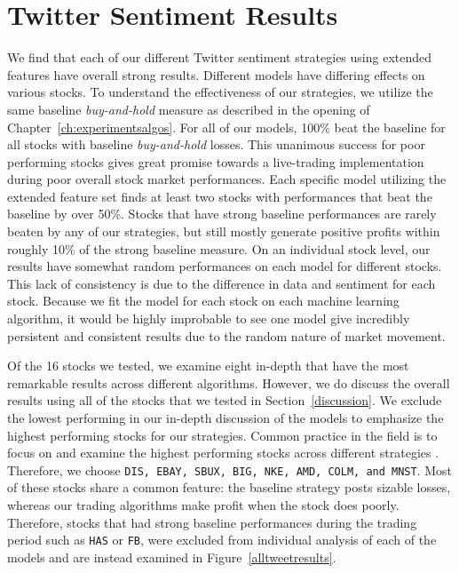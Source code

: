 \documentclass[../thesis.tex]{subfiles}
\begin{document}
\chapter{Twitter Sentiment Results}
\label{ch:sentimentresults}

We find that each of our different Twitter sentiment strategies using extended features have overall strong results. Different models have differing effects on various stocks. To understand the effectiveness of our strategies, we utilize the same baseline \textit{buy-and-hold} measure as described in the opening of Chapter~\ref{ch:experimentsalgos}. For all of our models, 100\% beat the baseline for all stocks with baseline \textit{buy-and-hold} losses. This unanimous success for poor performing stocks gives great promise towards a live-trading implementation during poor overall stock market performances. Each specific model utilizing the extended feature set finds at least two stocks with performances that beat the baseline by over 50\%. Stocks that have strong baseline performances are rarely beaten by any of our strategies, but still mostly generate positive profits within roughly 10\% of the strong baseline measure. On an individual stock level, our results have somewhat random performances on each model for different stocks. This lack of consistency is due to the difference in data and sentiment for each stock. Because we fit the model for each stock on each machine learning algorithm, it would be highly improbable to see one model give incredibly persistent and consistent results due to the random nature of market movement. 

Of the 16 stocks we tested, we examine eight in-depth that have the most remarkable results across different algorithms. However, we do discuss the overall results using all of the stocks that we tested in Section~\ref{discussion}. We exclude the lowest performing in our in-depth discussion of the models to emphasize the highest performing stocks for our strategies. Common practice in the field is to focus on and examine the highest performing stocks across different strategies \cite{Aldridge2010}. Therefore, we choose \texttt{DIS, EBAY, SBUX, BIG, NKE, AMD, COLM, and MNST}. Most of these stocks share a common feature: the baseline strategy posts sizable losses, whereas our trading algorithms make profit when the stock does poorly. Therefore, stocks that had strong baseline performances during the trading period such as \texttt{HAS} or \texttt{FB}, were excluded from individual analysis of each of the models and are instead examined in Figure~\ref{alltweetresults}. 
\end{document}
